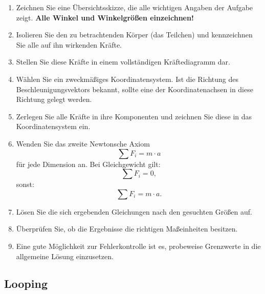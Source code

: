 \documentclass[10pt,a4paper]{article}
\begin{document}
	\begin{enumerate}
		\item Zeichnen Sie eine Übersichtsskizze, die alle wichtigen Angaben der Aufgabe zeigt.
		\textbf{Alle Winkel und Winkelgrößen einzeichnen!}
		
		\item Isolieren Sie den zu betrachtenden Körper (das Teilchen) und kennzeichnen Sie alle auf ihn wirkenden Kräfte.
		
		\item Stellen Sie diese Kräfte in einem vollständigen Kräftediagramm dar.
		
		\item Wählen Sie ein zweckmäßiges Koordinatensystem.
		Ist die Richtung des Beschleunigungsvektors bekannt, sollte eine der Koordinatenachsen in diese Richtung gelegt werden.
		
		\item Zerlegen Sie alle Kräfte in ihre Komponenten und zeichnen Sie diese in das Koordinatensystem ein.
		
		\item Wenden Sie das zweite Newtonsche Axiom
		\[
		\sum F_i = m \cdot a
		\]
		für jede Dimension an. Bei Gleichgewicht gilt:
		\[
		\sum F_i = 0,
		\]
		sonst:
		\[
		\sum F_i = m \cdot a.
		\]
		
		\item Lösen Sie die sich ergebenden Gleichungen nach den gesuchten Größen auf.
		
		\item Überprüfen Sie, ob die Ergebnisse die richtigen Maßeinheiten besitzen.
		
		\item Eine gute Möglichkeit zur Fehlerkontrolle ist es, probeweise Grenzwerte
		in die allgemeine Lösung einzusetzen.
	\end{enumerate}
	
	\subsection{Looping}
	
\end{document}
